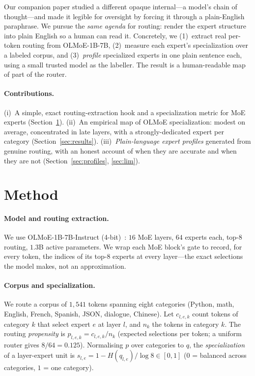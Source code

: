 \documentclass{article}
\begin{document}
Our companion paper studied a different opaque internal---a model's chain of
thought---and made it legible for oversight by forcing it through a plain-English
paraphrase. We pursue the \emph{same agenda} for routing: render the expert
structure into plain English so a human can read it. Concretely, we (1)~extract
real per-token routing from OLMoE-1B-7B, (2)~measure each expert's specialization
over a labeled corpus, and (3)~\emph{profile} specialized experts in one plain
sentence each, using a small trusted model as the labeller. The result is a
human-readable map of part of the router.

\paragraph{Contributions.}
(i)~A simple, exact routing-extraction hook and a specialization metric for MoE
experts (Section~\ref{sec:method}).
(ii)~An empirical map of OLMoE specialization: modest on average, concentrated in
late layers, with a strongly-dedicated expert per category
(Section~\ref{sec:results}).
(iii)~\emph{Plain-language expert profiles} generated from genuine routing, with
an honest account of when they are accurate and when they are not
(Section~\ref{sec:profiles}, \ref{sec:lim}).

\section{Method}\label{sec:method}
\paragraph{Model and routing extraction.} We use OLMoE-1B-7B-Instruct
(4-bit)~\citep{muennighoff2024olmoe}: $16$ MoE layers, $64$ experts each, top-$8$
routing, $1.3$B active parameters. We wrap each MoE block's gate to record, for
every token, the indices of its top-$8$ experts at every layer---the exact
selections the model makes, not an approximation.

\paragraph{Corpus and specialization.} We route a corpus of $1{,}541$ tokens
spanning eight categories (Python, math, English, French, Spanish, JSON,
dialogue, Chinese). Let $c_{l,e,k}$ count tokens of category $k$ that select
expert $e$ at layer $l$, and $n_k$ the tokens in category $k$. The routing
\emph{propensity} is $p_{l,e,k}=c_{l,e,k}/n_k$ (expected selections per token; a
uniform router gives $8/64=0.125$). Normalising $p$ over categories to $q$, the
\emph{specialization} of a layer-expert unit is $s_{l,e}=1-H(q_{l,e})/\log 8\in[0,1]$
($0$ = balanced across categories, $1$ = one category).
\end{document}
